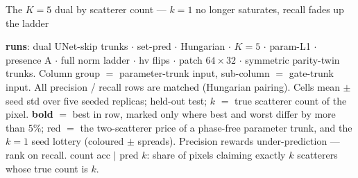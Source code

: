 \begin{frame}{The $K{=}5$ dual by scatterer count --- $k{=}1$ no longer saturates, recall fades up the ladder}
  \parbox{0.82\textwidth}{\tiny\color{soft} \textbf{runs}: dual UNet-skip trunks $\cdot$ set-pred $\cdot$ Hungarian $\cdot$ $K{=}5$ $\cdot$ param-L1 $\cdot$ presence A $\cdot$ full norm ladder $\cdot$ hv flips $\cdot$ patch $64{\times}32$ $\cdot$ symmetric parity-twin trunks. Column group $=$ parameter-trunk input, sub-column $=$ gate-trunk input. All precision / recall rows are matched (Hungarian pairing). Cells mean $\pm$ seed std over five seeded replicas; held-out test; $k$ $=$ true scatterer count of the pixel. \textbf{bold} $=$ best in row, marked only where best and worst differ by more than $5\%$; \textcolor{accent}{red} $=$ the two-scatterer price of a phase-free parameter trunk, and the $k{=}1$ seed lottery (coloured $\pm$ spreads). Precision rewards under-prediction --- rank on recall. count acc $\mid$ pred $k$: share of pixels claiming exactly $k$ scatterers whose true count is $k$.\par}
\end{frame}

